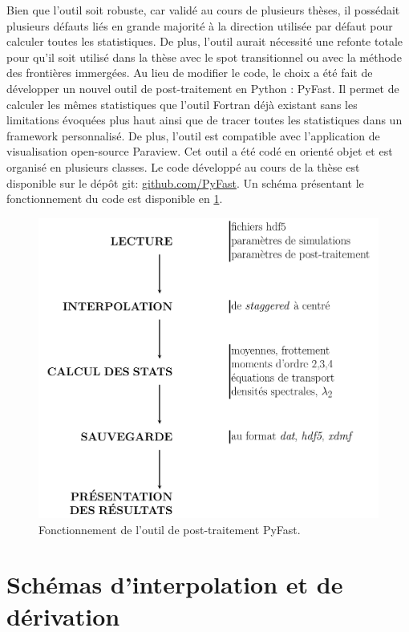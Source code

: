 Bien que l'outil soit robuste, car validé au cours de plusieurs thèses, il possédait plusieurs défauts liés en grande majorité à la direction utilisée par défaut pour calculer toutes les statistiques. De plus, l'outil aurait nécessité une refonte totale pour qu'il soit utilisé dans la thèse avec le spot transitionnel ou avec la méthode des frontières immergées. Au lieu de modifier le code, le choix a été fait de développer un nouvel outil de post-traitement en Python : PyFast. Il permet de calculer les mêmes statistiques que l'outil Fortran déjà existant sans les limitations évoquées plus haut ainsi que de tracer toutes les statistiques dans un framework personnalisé. De plus, l'outil est compatible avec l'application de visualisation open-source Paraview. Cet outil a été codé en orienté objet et est organisé en plusieurs classes. Le code développé au cours de la thèse est disponible sur le dépôt git: \href{https://github.com/Benji12358/PyFast}{github.com/PyFast}. Un schéma présentant le fonctionnement du code est disponible en \cref{fig/presentation_PyFast}.

\begin{figure}[!hbtp]
    \centering
    \includegraphics[width=0.75\linewidth]{Annexes/Pictures/Annexe1/presentation_PyFast.pdf}
    \caption{Fonctionnement de l'outil de post-traitement PyFast.}
    \label{fig/presentation_PyFast}
\end{figure}

\clearpage
\section{Schémas d'interpolation et de dérivation}

